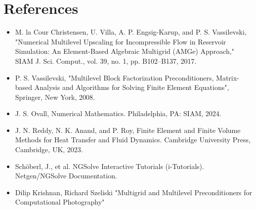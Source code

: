 \documentclass[aspectratio=169,11pt]{beamer}
\begin{document}
\section{References}
\begin{frame}
  \begin{itemize}
    \item M. la Cour Christensen, U. Villa, A. P. Engsig-Karup, and P. S. Vassilevski, "Numerical Multilevel Upscaling for Incompressible Flow in Reservoir Simulation: An Element-Based Algebraic Multigrid (AMGe) Approach," SIAM J. Sci. Comput., vol. 39, no. 1, pp. B102–B137, 2017.
    \item P. S. Vassilevski, "Multilevel Block Factorization Preconditioners, Matrix-based Analysis and Algorithms for Solving Finite Element Equations", Springer, New York, 2008.
    \item J. S. Ovall, Numerical Mathematics. Philadelphia, PA: SIAM, 2024. 
    \item J. N. Reddy, N. K. Anand, and P. Roy, Finite Element and Finite Volume Methods for Heat Transfer and Fluid Dynamics. Cambridge University Press, Cambridge, UK, 2023. 
    \item Schöberl, J., et al. NGSolve Interactive Tutorials (i-Tutorials). Netgen/NGSolve Documentation. 
    \item Dilip Krishnan, Richard Szeliski "Multigrid and Multilevel Preconditioners for Computational Photography" 
  \end{itemize}
\end{frame}
\end{document}
